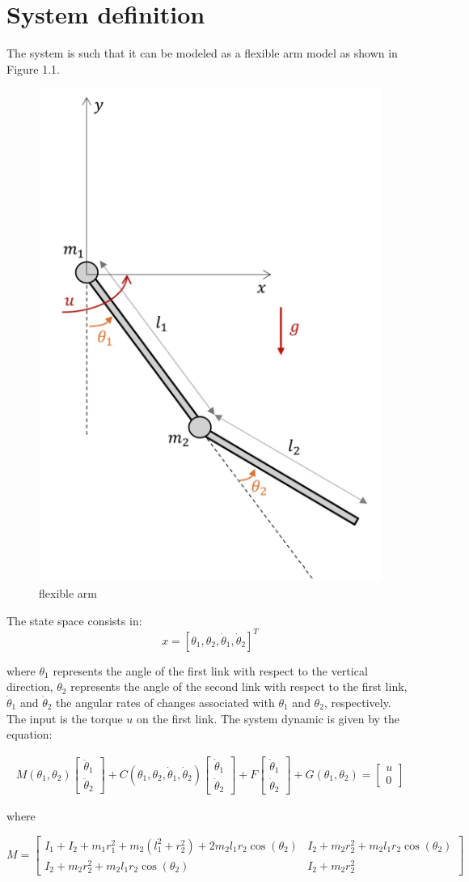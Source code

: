 \documentclass[a4paper,11pt,oneside]{book}
\begin{document}
\section{System definition}
\begin{flushleft}
    {The system is such that it can be modeled as a flexible arm model as shown in Figure 1.1.}
\end{flushleft}
\begin{figure}[H]
    \centering
    \includegraphics[width=0.3\linewidth]{image.png}
    \caption{flexible arm}
    \label{fig:enter-label}
\end{figure}
\begin{flushleft}
    {The state space consists in: \[x = [\theta_1, \theta_2, \dot{\theta}_1, \dot{\theta}_2]^T\]}
\end{flushleft}
\begin{justify}
    {where $\theta_1$ represents the angle of the first link with respect to the vertical direction, $\theta_2$ represents the angle of the second link with respect to the first link, $\dot{\theta}_1$ and $\dot{\theta}_2$ the angular rates of changes associated with $\theta_1$ and $\theta_2$, respectively. The input is the torque $u$ on the first link. The system dynamic is given by the equation:}
\end{justify}
\begin{align}
    M(\theta_1, \theta_2)
\begin{bmatrix}
    \ddot{\theta}_1 \\
    \ddot{\theta}_2
\end{bmatrix}
+ C(\theta_1, \theta_2, \dot{\theta}_1, \dot{\theta}_2)
\begin{bmatrix}
\dot{\theta}_1 \\
\dot{\theta}_2
\end{bmatrix}
+ F
\begin{bmatrix}
\dot{\theta}_1 \\
\dot{\theta}_2
\end{bmatrix}
+ G(\theta_1, \theta_2)
=
\begin{bmatrix}
u \\
0
\end{bmatrix}
\end{align}
\begin{flushleft}
    {where}
\end{flushleft}
\[
    M = 
\begin{bmatrix}
I_1 + I_2 + m_1r_1^2 + m_2(l_1^2 + r_2^2) + 2m_2l_1r_2\cos(\theta_2) & I_2 + m_2r_2^2 + m_2l_1r_2\cos(\theta_2) \\
I_2 + m_2r_2^2 + m_2l_1r_2\cos(\theta_2) & I_2 + m_2r_2^2
\end{bmatrix}
\]
\end{document}
